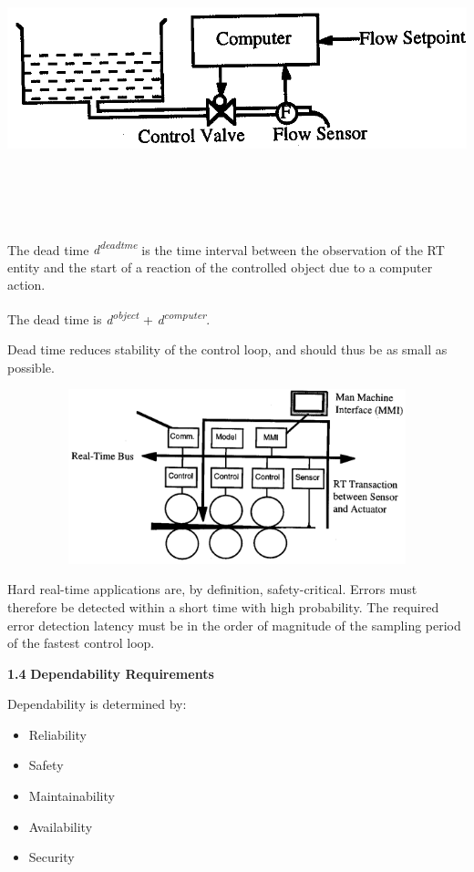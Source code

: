 \includegraphics[width=6.64444in,height=3.26042in]{media/Fig_1_8.png}

The dead time \emph{d\textsuperscript{deadtme }}is the time interval
between the observation of the RT entity and the start of a reaction of
the controlled object due to a computer action.

The dead time is \emph{d\textsuperscript{object}} +
\emph{d\textsuperscript{computer}}.

Dead time reduces stability of the control loop, and should thus be as
small as possible.

\includegraphics[width=7.50625in,height=1.99236in]{media/Fig_1_9.png}

Hard real-time applications are, by definition, safety-critical. Errors
must therefore be detected within a short time with high probability.
The required error detection latency must be in the order of magnitude
of the sampling period of the fastest control loop.

\textbf{1.4} \protect\hypertarget{teil5}{}{}\textbf{Dependability
Requirements}

Dependability is determined by:

\begin{itemize}
\item
  Reliability
\item
  Safety
\item
  Maintainability
\item
  Availability
\item
  Security
\end{itemize}

